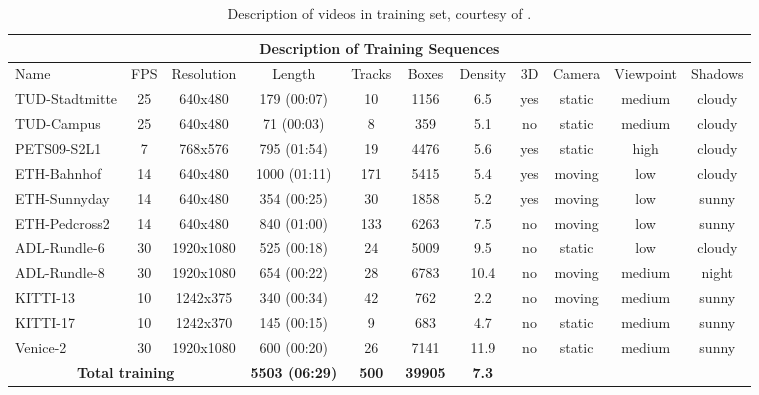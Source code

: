 \begin{table*}[tbp]
\begin {center}
\begin{tabular}{|l| c| c| c| c| c| c| c |c | c | c| }
\hline
\multicolumn{11}{|c|}{\bf Description of Training Sequences} \\ 
\hline 
      Name & FPS & Resolution & Length & Tracks & Boxes & Density & 3D & Camera & Viewpoint & Shadows  \\ 
      \hline
     TUD-Stadtmitte & 25 & 640x480 & 179 (00:07) & 10 & 1156 & 6.5 & yes & static  & medium & cloudy  \\
     TUD-Campus & 25 & 640x480 & 71 (00:03) & 8 & 359 & 5.1 & no & static & medium & cloudy  \\
    PETS09-S2L1 & 7 & 768x576 & 795 (01:54) & 19 & 4476 & 5.6 & yes & static & high & cloudy  \\
    ETH-Bahnhof & 14 & 640x480 & 1000 (01:11) & 171 & 5415 & 5.4 & yes & moving & low & cloudy	 \\
    ETH-Sunnyday & 14 & 640x480 & 354 (00:25) & 30 & 1858 & 5.2 & yes & moving & low & sunny	 \\
     ETH-Pedcross2 & 14 & 640x480 & 840 (01:00) & 133 & 6263 & 7.5 &no & moving & low & sunny \\
     ADL-Rundle-6 & 30 & 1920x1080 & 525 (00:18) & 24 & 5009 & 9.5 &no & static & low & cloudy  \\
      ADL-Rundle-8 & 30 & 1920x1080 & 654 (00:22) & 28 & 6783 & 10.4 &no & moving & medium & night  \\
      KITTI-13 & 10 & 1242x375 & 340 (00:34) & 42 & 762 & 2.2 &no & moving & medium & sunny  \\
       KITTI-17 & 10 & 1242x370 & 145 (00:15) & 9 & 683 & 4.7 &no & static & medium & sunny  \\
      Venice-2 & 30 & 1920x1080 & 600 (00:20) & 26 & 7141 & 11.9 &no & static & medium & sunny \\
\hline
\multicolumn{3}{|c|}{\bf Total training} & {\bf 5503 (06:29)} & {\bf 500} & {\bf 39905} & {\bf 7.3} & & & &  \\
\hline
\end{tabular}
\end{center}
\caption{Description of videos in training set, courtesy of \cite{motchallenge2015}.}
\label{tab:dataoverview}
\end{table*}